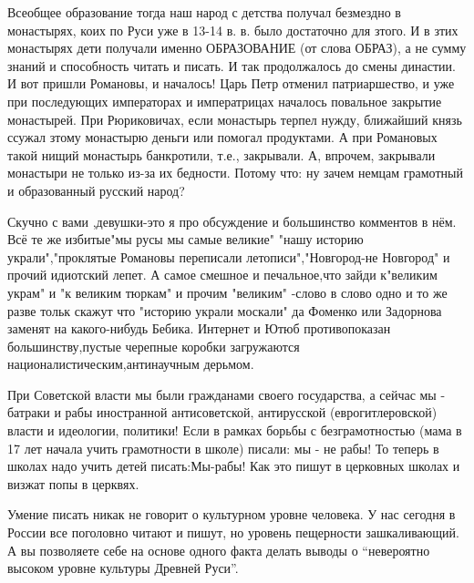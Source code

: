 \begin{itemize}
Всеобщее образование тогда наш народ с детства получал безмездно в монастырях,
коих по Руси уже в 13-14 в. в. было достаточно для зтого. И в зтих монастырях
дети получали именно ОБРАЗОВАНИЕ (от слова ОБРАЗ), а не сумму знаний и
способность читать и писать. И так продолжалось до смены династии. И вот пришли
Романовы, и началось! Царь Петр отменил патриаршество, и уже при последующих
императорах и императрицах началось повальное закрытие монастырей. При
Рюриковичах, если монастырь терпел нужду, ближайший князь ссужал зтому
монастырю деньги или помогал продуктами. А при Романовых такой нищий монастырь
банкротили, т.е., закрывали. А, впрочем, закрывали монастыри не только из-за их
бедности. Потому что: ну зачем немцам грамотный и образованный русский народ?


Скучно с вами ,девушки-это я про обсуждение и большинство комментов в нём. Всё
те же избитые"мы русы мы самые великие" "нашу историю украли","проклятые
Романовы переписали летописи","Новгород-не Новгород" и прочий идиотский лепет.
А самое смешное и печальное,что зайди к"великим украм" и "к великим тюркам" и
прочим "великим" -слово в слово одно и то же разве тольк скажут что "историю
украли москали" да Фоменко или Задорнова заменят на какого-нибудь Бебика.
Интернет и Ютюб противопоказан большинству,пустые черепные коробки загружаются
националистическим,антинаучным дерьмом.


При Советской власти мы были гражданами своего государства, а сейчас мы -
батраки и рабы иностранной антисоветской, антирусской (еврогитлеровской) власти
и идеологии, политики! Если в рамках борьбы с безграмотностью (мама в 17 лет
начала учить грамотности в школе) писали: мы - не рабы! То теперь в школах надо
учить детей писать:Мы-рабы! Как это пишут в церковных школах и визжат попы в
церквях.


Умение писать никак не говорит о культурном уровне человека. У нас сегодня в
России все поголовно читают и пишут, но уровень пещерности зашкаливающий. А вы
позволяете себе на основе одного факта делать выводы о \enquote{невероятно высоком
уровне культуры Древней Руси}.

\end{itemize}

